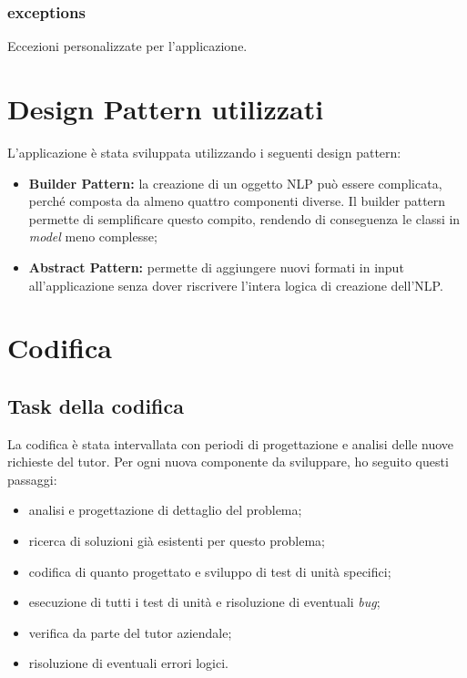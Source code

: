 \subsubsection{exceptions} %
Eccezioni personalizzate per l'applicazione.

\begin{namespacedesc}
\end{namespacedesc}

\section{Design Pattern utilizzati}
L'applicazione è stata sviluppata utilizzando i seguenti design pattern:
\begin{itemize}
    \item \textbf{Builder Pattern:} la creazione di un oggetto NLP può essere complicata, perché composta da almeno quattro componenti diverse. Il builder pattern permette di semplificare questo compito, rendendo di conseguenza le classi in \textit{model} meno complesse;
    \item \textbf{Abstract Pattern:} permette di aggiungere nuovi formati in input all'applicazione senza dover riscrivere l'intera logica di creazione dell'NLP.
\end{itemize}  

\section{Codifica}
\subsection{Task della codifica}
La codifica è stata intervallata con periodi di progettazione e analisi delle nuove richieste del tutor.
Per ogni nuova componente da sviluppare, ho seguito questi passaggi:
\begin{itemize}
    \item analisi e progettazione di dettaglio del problema;
    \item ricerca di soluzioni già esistenti per questo problema;
    \item codifica di quanto progettato e sviluppo di test di unità specifici;
    \item esecuzione di tutti i test di unità e risoluzione di eventuali \textit{bug};
    \item verifica da parte del tutor aziendale;
    \item risoluzione di eventuali errori logici.
\end{itemize}

